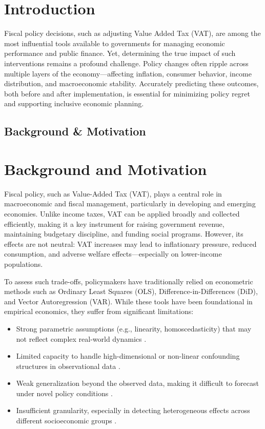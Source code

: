 \section{Introduction}\label{sec:intro}

Fiscal policy decisions, such as adjusting Value Added Tax (VAT), are among the most influential tools available to governments for managing economic performance and public finance. Yet, determining the true impact of such interventions remains a profound challenge. Policy changes often ripple across multiple layers of the economy---affecting inflation, consumer behavior, income distribution, and macroeconomic stability. Accurately predicting these outcomes, both before and after implementation, is essential for minimizing policy regret and supporting inclusive economic planning.

\subsection{Background \& Motivation}\label{subsec:background}

\section{Background and Motivation}

Fiscal policy, such as Value-Added Tax (VAT), plays a central role in macroeconomic and fiscal management, particularly in developing and emerging economies. Unlike income taxes, VAT can be applied broadly and collected efficiently, making it a key instrument for raising government revenue, maintaining budgetary discipline, and funding social programs. However, its effects are not neutral: VAT increases may lead to inflationary pressure, reduced consumption, and adverse welfare effects—especially on lower-income populations.

To assess such trade-offs, policymakers have traditionally relied on econometric methods such as Ordinary Least Squares (OLS), Difference-in-Differences (DiD), and Vector Autoregression (VAR). While these tools have been foundational in empirical economics, they suffer from significant limitations:

\begin{itemize}
  \item Strong parametric assumptions (e.g., linearity, homoscedasticity) that may not reflect complex real-world dynamics \citep{hellwig2021predicting}.
  \item Limited capacity to handle high-dimensional or non-linear confounding structures in observational data \citep{vallarino2024machine}.
  \item Weak generalization beyond the observed data, making it difficult to forecast under novel policy conditions \citep{idb2024ai}.
  \item Insufficient granularity, especially in detecting heterogeneous effects across different socioeconomic groups \citep{wager2019causal}.
\end{itemize}

